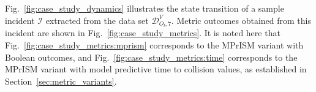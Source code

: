\documentclass[journal]{IEEEtran}
\begin{document}
\begin{table}[]
    \caption{Hyper-parameters for RSS metric variants.}
    \label{tab:rss_variants}
    \centering
\end{table}


Fig.~\ref{fig:case_study_dynamics} illustrates the state transition of a sample incident $\mathcal{I}$ extracted from the data set $\mathcal{D}^V_{O_l, 7}$. Metric outcomes obtained from this incident are shown in Fig.~\ref{fig:case_study_metrics}. It is noted here that Fig.~\ref{fig:case_study_metrics:mprism} corresponds to the MPrISM variant with Boolean outcomes, and Fig.~\ref{fig:case_study_metrics:time} corresponds to the MPrISM variant with model predictive time to collision values, as established in Section~\ref{sec:metric_variants}.
\end{document}
